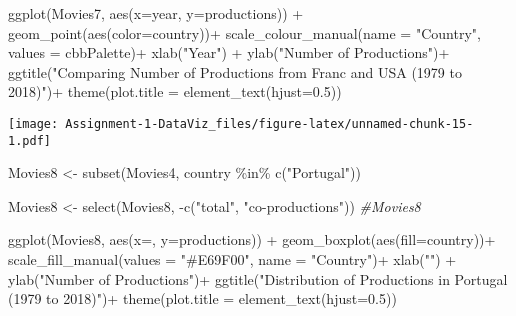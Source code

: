 \documentclass[
]{article}
\newenvironment{Shaded}{\begin{snugshade}}{\end{snugshade}}
\newcommand{\AttributeTok}[1]{\textcolor[rgb]{0.77,0.63,0.00}{#1}}
\newcommand{\CommentTok}[1]{\textcolor[rgb]{0.56,0.35,0.01}{\textit{#1}}}
\newcommand{\FloatTok}[1]{\textcolor[rgb]{0.00,0.00,0.81}{#1}}
\newcommand{\FunctionTok}[1]{\textcolor[rgb]{0.00,0.00,0.00}{#1}}
\newcommand{\NormalTok}[1]{#1}
\newcommand{\OtherTok}[1]{\textcolor[rgb]{0.56,0.35,0.01}{#1}}
\newcommand{\SpecialCharTok}[1]{\textcolor[rgb]{0.00,0.00,0.00}{#1}}
\newcommand{\StringTok}[1]{\textcolor[rgb]{0.31,0.60,0.02}{#1}}
\begin{document}
\begin{Shaded}
\begin{Highlighting}[]
  \FunctionTok{ggplot}\NormalTok{(Movies7, }\FunctionTok{aes}\NormalTok{(}\AttributeTok{x=}\NormalTok{year, }\AttributeTok{y=}\NormalTok{productions)) }\SpecialCharTok{+} 
  \FunctionTok{geom\_point}\NormalTok{(}\FunctionTok{aes}\NormalTok{(}\AttributeTok{color=}\NormalTok{country))}\SpecialCharTok{+}
  \FunctionTok{scale\_colour\_manual}\NormalTok{(}\AttributeTok{name =} \StringTok{"Country"}\NormalTok{, }\AttributeTok{values =}\NormalTok{ cbbPalette)}\SpecialCharTok{+}
  \FunctionTok{xlab}\NormalTok{(}\StringTok{"Year"}\NormalTok{) }\SpecialCharTok{+} 
  \FunctionTok{ylab}\NormalTok{(}\StringTok{"Number of Productions"}\NormalTok{)}\SpecialCharTok{+}
  \FunctionTok{ggtitle}\NormalTok{(}\StringTok{"Comparing Number of Productions from Franc and USA (1979 to 2018)"}\NormalTok{)}\SpecialCharTok{+}
  \FunctionTok{theme}\NormalTok{(}\AttributeTok{plot.title =} \FunctionTok{element\_text}\NormalTok{(}\AttributeTok{hjust=}\FloatTok{0.5}\NormalTok{))}
\end{Highlighting}
\end{Shaded}

\texttt{[image: Assignment-1-DataViz\_files/figure-latex/unnamed-chunk-15-1.pdf]}

\begin{Shaded}
\begin{Highlighting}[]
\NormalTok{Movies8 }\OtherTok{\textless{}{-}} \FunctionTok{subset}\NormalTok{(Movies4, country }\SpecialCharTok{\%in\%} \FunctionTok{c}\NormalTok{(}\StringTok{"Portugal"}\NormalTok{))}

\NormalTok{Movies8 }\OtherTok{\textless{}{-}} \FunctionTok{select}\NormalTok{(Movies8, }\SpecialCharTok{{-}}\FunctionTok{c}\NormalTok{(}\StringTok{"total"}\NormalTok{, }\StringTok{"co{-}productions"}\NormalTok{))}
\CommentTok{\#Movies8}
\end{Highlighting}
\end{Shaded}

\begin{Shaded}
\begin{Highlighting}[]
\FunctionTok{ggplot}\NormalTok{(Movies8, }\FunctionTok{aes}\NormalTok{(}\AttributeTok{x=}\StringTok{\textquotesingle{}\textquotesingle{}}\NormalTok{, }\AttributeTok{y=}\NormalTok{productions)) }\SpecialCharTok{+}
  \FunctionTok{geom\_boxplot}\NormalTok{(}\FunctionTok{aes}\NormalTok{(}\AttributeTok{fill=}\NormalTok{country))}\SpecialCharTok{+}
  \FunctionTok{scale\_fill\_manual}\NormalTok{(}\AttributeTok{values =} \StringTok{"\#E69F00"}\NormalTok{, }\AttributeTok{name =} \StringTok{"Country"}\NormalTok{)}\SpecialCharTok{+}
  \FunctionTok{xlab}\NormalTok{(}\StringTok{""}\NormalTok{) }\SpecialCharTok{+} 
  \FunctionTok{ylab}\NormalTok{(}\StringTok{"Number of Productions"}\NormalTok{)}\SpecialCharTok{+}
  \FunctionTok{ggtitle}\NormalTok{(}\StringTok{"Distribution of Productions in Portugal (1979 to 2018)"}\NormalTok{)}\SpecialCharTok{+}
  \FunctionTok{theme}\NormalTok{(}\AttributeTok{plot.title =} \FunctionTok{element\_text}\NormalTok{(}\AttributeTok{hjust=}\FloatTok{0.5}\NormalTok{))}
\end{Highlighting}
\end{Shaded}
\end{document}
